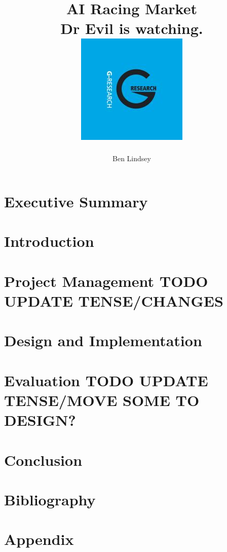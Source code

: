 \documentclass[11pt]{report}
\title{	
  {\huge AI Racing Market}\\
  {\large Dr Evil is watching.}\\[2em]
  {\includegraphics[scale=0.7]{G-Research.jpg}}
}
\author{Ben Lindsey}
\begin{document}
\maketitle

\tableofcontents

\chapter{Executive Summary}


\chapter{Introduction}


\chapter{Project Management TODO UPDATE TENSE/CHANGES}


\chapter{Design and Implementation}


\chapter{Evaluation TODO UPDATE TENSE/MOVE SOME TO DESIGN?}


\chapter{Conclusion}


\chapter{Bibliography}
\printbibliography

\appendix
\chapter{Appendix}

\end{document}
